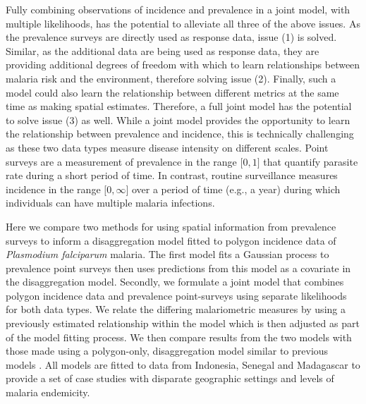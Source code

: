 \documentclass{statsoc}
\begin{document}
Fully combining observations of incidence and prevalence in a joint model, with multiple likelihoods, has the potential to alleviate all three of the above issues.
As the prevalence surveys are directly used as response data, issue (1) is solved.
Similar, as the additional data are being used as response data, they are providing additional degrees of freedom with which to learn relationships between malaria risk and the environment, therefore solving issue (2).
Finally, such a model could also learn the relationship between different metrics at the same time as making spatial estimates.
Therefore, a full joint model has the potential to solve issue (3) as well.
While a joint model provides the opportunity to learn the relationship between prevalence and incidence, this is technically challenging as these two data types measure disease intensity on different scales.
Point surveys are a measurement of prevalence in the range $\lbrack 0, 1\rbrack$ that quantify parasite rate during a short period of time.
In contrast, routine surveillance measures incidence in the range $\lbrack 0, \infty\rbrack$ over a period of time (e.g., a year) during which individuals can have multiple malaria infections.


Here we compare two methods for using spatial information from prevalence surveys to inform a disaggregation model fitted to polygon incidence data of \emph{Plasmodium falciparum}  malaria.
The first model fits a Gaussian process to prevalence point surveys then uses predictions from this model as a covariate in the disaggregation model.
Secondly, we formulate a joint model that combines polygon incidence data and prevalence point-surveys using separate likelihoods for both data types.
We relate the differing malariometric measures by using a previously estimated relationship within the model \citep{cameron2015defining} which is then adjusted as part of the model fitting process.
We then compare results from the two models with those made using a polygon-only, disaggregation model similar to previous models \citep{sturrock2014fine, wilson2017pointless}.
All models are fitted to data from Indonesia, Senegal and Madagascar to provide a set of case studies with disparate geographic settings and levels of malaria endemicity.
\end{document}
